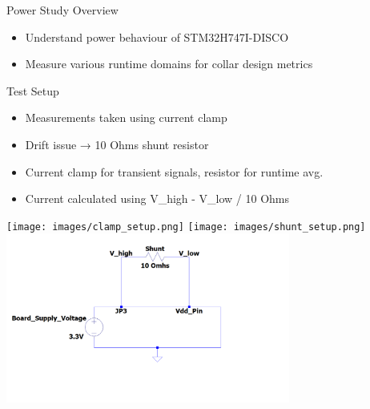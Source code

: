 \begin{frame}{Power Study Overview}
    \begin{itemize}
        \item Understand power behaviour of STM32H747I-DISCO
        \item Measure various runtime domains for collar design metrics
    \end{itemize}
\end{frame}

\begin{frame}{Test Setup}
    \begin{itemize}
        \item Measurements taken using current clamp
        \item Drift issue → 10 Ohms shunt resistor
        \item Current clamp for transient signals, resistor for runtime avg.
        \item Current calculated using V\_high - V\_low / 10 Ohms
    \end{itemize}  
    \texttt{[image: images/clamp\_setup.png]}
    \texttt{[image: images/shunt\_setup.png]}
    \includegraphics[height=0.35\textheight,width=0.7\textwidth,keepaspectratio]{images/shunt.png}
\end{frame}

